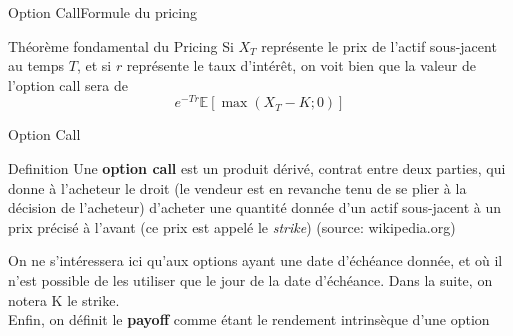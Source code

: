 \documentclass{beamer}
\newcommand{\1}{\mathmybb{1}}
\begin{document}
\begin{frame}{Option Call}{Formule du pricing}
\begin{block}{Théorème fondamental du Pricing}
    Si $X_T$  représente le prix de l'actif sous-jacent au temps $T$, et si $r$ représente le taux d'intérêt, on voit bien que la valeur de l'option call sera de
    \begin{equation} \label{tfp}
      e^{-Tr}\mathbb{E}\left[ \max \left(X_{T} - K; 0 \right) \right]
    \end{equation}
  \end{block}
  \end{frame}
\begin{frame}{Option Call}
  \begin{block}{Definition}
    Une \textbf{option call} est un produit dérivé, contrat entre deux parties, qui donne à l'acheteur le droit (le vendeur est en revanche tenu de se plier à la décision de l'acheteur) d'acheter une quantité donnée d'un actif sous-jacent à un prix précisé à l'avant (ce prix est appelé le {\em strike}) (source: wikipedia.org)
  \end{block}
  \pause
  On ne s'intéressera ici qu'aux options ayant une date d'échéance donnée, et où il n'est possible de les utiliser que le jour de la date d'échéance.
  Dans la suite, on notera K le strike. \\
  Enfin, on définit le \textbf{payoff} comme étant le rendement intrinsèque d'une option
\end{frame}
\end{document}
